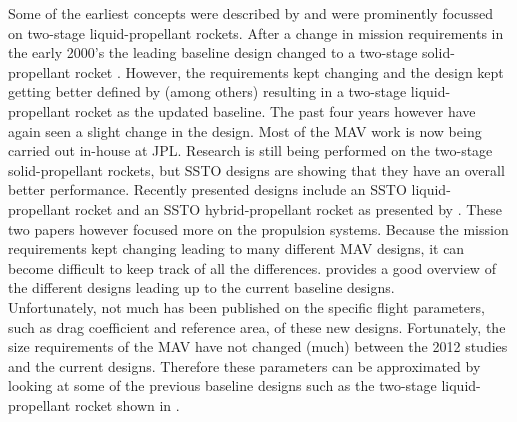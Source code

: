 Some of the earliest concepts were described by \cite{whitehead1997,guernsey1998,desai1998,stone1999} and were prominently focussed on two-stage liquid-propellant rockets. After a change in mission requirements in the early 2000's the leading baseline design changed to a two-stage solid-propellant rocket \citep{stephenson2002,whitehead2005,stephenson2006}. However, the requirements kept changing and the design kept getting better defined by (among others) \cite{sengupta2012,trinidad2012,mungas2012,mppg2012} resulting in a two-stage liquid-propellant rocket as the updated baseline. The past four years however have again seen a slight change in the design. Most of the \ac{MAV} work is now being carried out in-house at \ac{JPL}. Research is still being performed on the two-stage solid-propellant rockets, but \ac{SSTO} designs are showing that they have an overall better performance. Recently presented designs include an \ac{SSTO} liquid-propellant rocket \citep{vaughan2016technology} and an \ac{SSTO} hybrid-propellant rocket as presented by \cite{karp2016technology}. These two papers however focused more on the propulsion systems. Because the mission requirements kept changing leading to many different \ac{MAV} designs, it can become difficult to keep track of all the differences. \cite{shotwell2016history} provides a good overview of the different designs leading up to the current baseline designs. \\







\noindent
Unfortunately, not much has been published on the specific flight parameters, such as drag coefficient and reference area, of these new designs. Fortunately, the size requirements of the \ac{MAV} have not changed (much) between the 2012 studies and the current designs. Therefore these parameters can be approximated by looking at some of the previous baseline designs such as the two-stage liquid-propellant rocket shown in . 


